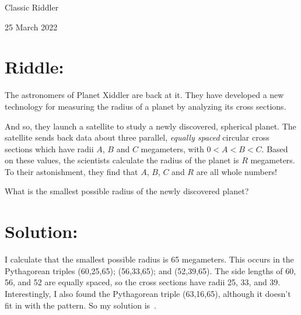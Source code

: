 \documentclass{article}
\begin{document}
\pagestyle{empty} %

\begin{center}
{\LARGE Classic Riddler}

\vspace{0.15in}

{\Large 25 March 2022}
\end{center}


\section*{Riddle:}

The astronomers of Planet Xiddler are back at it.
They have developed a new technology for measuring the radius of a planet by analyzing its cross sections.

And so, they launch a satellite to study a newly discovered, spherical planet.
The satellite sends back data about three parallel, \textit{equally spaced} circular cross sections which have radii $A$, $B$ and $C$ megameters, with $0<A<B<C$.
Based on these values, the scientists calculate the radius of the planet is $R$ megameters.
To their astonishment, they find that $A$, $B$, $C$ and $R$ are all whole numbers!

What is the smallest possible radius of the newly discovered planet?


\section*{Solution:}

I calculate that the smallest possible radius is 65 megameters.
This occurs in the Pythagorean triples (60,25,65); (56,33,65); and (52,39,65).
The side lengths of 60, 56, and 52 are equally spaced, so the cross sections have radii 
25, 33, and 39.
Interestingly, I also found the Pythagorean triple (63,16,65), although it doesn't fit in with the pattern.
So my solution is \,.
\end{document}
